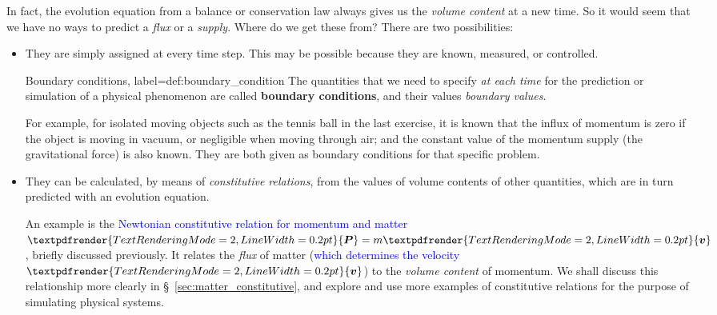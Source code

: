 \documentclass[a4paper,12pt,%
onecolumn,oneside,%
british%
]{memoir}
\renewcommand*{\bm}[1]{\textpdfrender{TextRenderingMode=2,LineWidth=0.2pt}{\boldsymbol{#1}}}
\renewcommand*{\|}[1][]{\nonscript\:#1\vert\nonscript\:\mathopen{}}
\newcommand*{\sect}{\S}%
\renewcommand*{\autoref}[2]{\sidepar{\vspace{-1ex}\footnotesize{\color{blue}\faIcon{%
angle-right%
}\enskip\sect~\ref{#1} page~\pageref{#1}}}\textcolor{blue}{#2}}
\newcommand*{\yv}{\bm{v}}
\newcommand*{\ym}{m}%
\newcommand*{\yP}{\bm{P}}
\begin{document}
In fact, the evolution equation from a balance or conservation law always gives us the \emph{volume content} at a new time. So it would seem that we have no ways to predict a \emph{flux} or a \emph{supply}. Where do we get these from? There are two possibilities:
\begin{itemize}[para]
\item They are simply assigned at every time step. This may be possible because they are known, measured, or controlled.
  \begin{definition}{Boundary conditions, label={def:boundary_condition}}
    The quantities that we need to specify \emph{at each time} for the prediction or simulation of a physical phenomenon are called \textbf{boundary conditions}, and their values \emph{boundary values}.
  \end{definition}

  For example, for isolated moving objects such as the tennis ball in the last exercise, it is known that the influx of momentum is zero if the object is moving in vacuum, or negligible when moving through air; and the constant value of the momentum supply (the gravitational force) is also known. They are both given as boundary conditions for that specific problem.

\item They can be calculated, by means of \emph{constitutive relations}, from the values of volume contents of other quantities, which are in turn predicted with an evolution equation.

  An example is the \autoref{item:momentum_mass_velocity}{Newtonian constitutive relation for momentum and matter} $\yP = \ym\yv$, briefly discussed previously. It relates the \emph{flux} of matter (\autoref{sec:fluxes_velocities}{which determines the velocity $\yv$}) to the \emph{volume content} of momentum. We shall discuss this relationship more clearly in \sect~\ref{sec:matter_constitutive}, and explore and use more examples of constitutive relations for the purpose of simulating physical systems.
\end{itemize}
\end{document}
